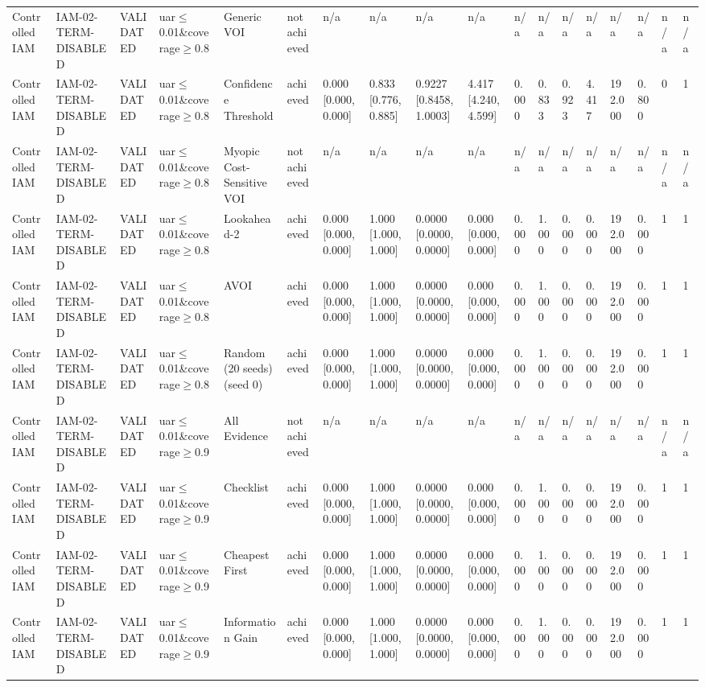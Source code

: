 \begin{table}[!ht]
{\begin{tabular}{llllllllllllllllll}
Controlled IAM & IAM-02-TERM-DISABLED & VALIDATED & uar$\le$0.01\&coverage$\ge$0.8 & Generic VOI & not achieved & n/a & n/a & n/a & n/a & n/a & n/a & n/a & n/a & n/a & n/a & n/a & n/a \\
Controlled IAM & IAM-02-TERM-DISABLED & VALIDATED & uar$\le$0.01\&coverage$\ge$0.8 & Confidence Threshold & achieved & 0.000 [0.000, 0.000] & 0.833 [0.776, 0.885] & 0.9227 [0.8458, 1.0003] & 4.417 [4.240, 4.599] & 0.000 & 0.833 & 0.923 & 4.417 & 192.000 & 0.800 & 0 & 1 \\
Controlled IAM & IAM-02-TERM-DISABLED & VALIDATED & uar$\le$0.01\&coverage$\ge$0.8 & Myopic Cost-Sensitive VOI & not achieved & n/a & n/a & n/a & n/a & n/a & n/a & n/a & n/a & n/a & n/a & n/a & n/a \\
Controlled IAM & IAM-02-TERM-DISABLED & VALIDATED & uar$\le$0.01\&coverage$\ge$0.8 & Lookahead-2 & achieved & 0.000 [0.000, 0.000] & 1.000 [1.000, 1.000] & 0.0000 [0.0000, 0.0000] & 0.000 [0.000, 0.000] & 0.000 & 1.000 & 0.000 & 0.000 & 192.000 & 0.000 & 1 & 1 \\
Controlled IAM & IAM-02-TERM-DISABLED & VALIDATED & uar$\le$0.01\&coverage$\ge$0.8 & AVOI & achieved & 0.000 [0.000, 0.000] & 1.000 [1.000, 1.000] & 0.0000 [0.0000, 0.0000] & 0.000 [0.000, 0.000] & 0.000 & 1.000 & 0.000 & 0.000 & 192.000 & 0.000 & 1 & 1 \\
Controlled IAM & IAM-02-TERM-DISABLED & VALIDATED & uar$\le$0.01\&coverage$\ge$0.8 & Random (20 seeds) (seed 0) & achieved & 0.000 [0.000, 0.000] & 1.000 [1.000, 1.000] & 0.0000 [0.0000, 0.0000] & 0.000 [0.000, 0.000] & 0.000 & 1.000 & 0.000 & 0.000 & 192.000 & 0.000 & 1 & 1 \\
Controlled IAM & IAM-02-TERM-DISABLED & VALIDATED & uar$\le$0.01\&coverage$\ge$0.9 & All Evidence & not achieved & n/a & n/a & n/a & n/a & n/a & n/a & n/a & n/a & n/a & n/a & n/a & n/a \\
Controlled IAM & IAM-02-TERM-DISABLED & VALIDATED & uar$\le$0.01\&coverage$\ge$0.9 & Checklist & achieved & 0.000 [0.000, 0.000] & 1.000 [1.000, 1.000] & 0.0000 [0.0000, 0.0000] & 0.000 [0.000, 0.000] & 0.000 & 1.000 & 0.000 & 0.000 & 192.000 & 0.000 & 1 & 1 \\
Controlled IAM & IAM-02-TERM-DISABLED & VALIDATED & uar$\le$0.01\&coverage$\ge$0.9 & Cheapest First & achieved & 0.000 [0.000, 0.000] & 1.000 [1.000, 1.000] & 0.0000 [0.0000, 0.0000] & 0.000 [0.000, 0.000] & 0.000 & 1.000 & 0.000 & 0.000 & 192.000 & 0.000 & 1 & 1 \\
Controlled IAM & IAM-02-TERM-DISABLED & VALIDATED & uar$\le$0.01\&coverage$\ge$0.9 & Information Gain & achieved & 0.000 [0.000, 0.000] & 1.000 [1.000, 1.000] & 0.0000 [0.0000, 0.0000] & 0.000 [0.000, 0.000] & 0.000 & 1.000 & 0.000 & 0.000 & 192.000 & 0.000 & 1 & 1 \\

\end{tabular}}
\end{table}
